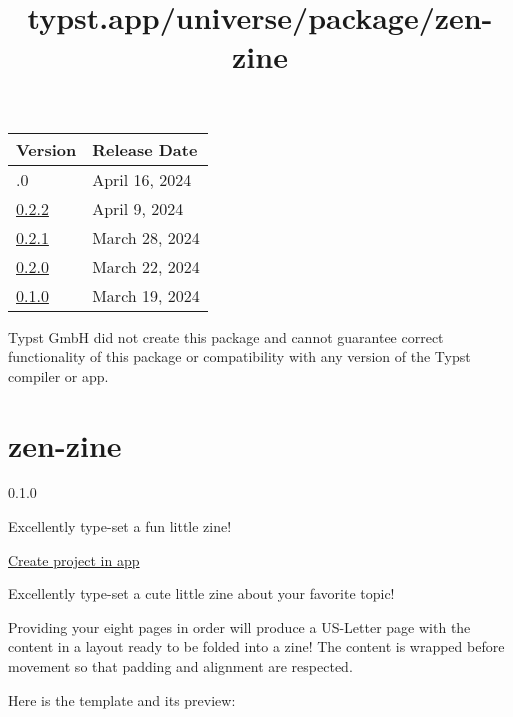 \begin{longtable}[]{@{}ll@{}}
\toprule\noalign{}
Version & Release Date \\
\midrule\noalign{}
\endhead
\bottomrule\noalign{}
\endlastfoot
0.3.0 & April 16, 2024 \\
\href{https://typst.app/universe/package/suiji/0.2.2/}{0.2.2} & April 9,
2024 \\
\href{https://typst.app/universe/package/suiji/0.2.1/}{0.2.1} & March
28, 2024 \\
\href{https://typst.app/universe/package/suiji/0.2.0/}{0.2.0} & March
22, 2024 \\
\href{https://typst.app/universe/package/suiji/0.1.0/}{0.1.0} & March
19, 2024 \\
\end{longtable}

Typst GmbH did not create this package and cannot guarantee correct
functionality of this package or compatibility with any version of the
Typst compiler or app.


\title{typst.app/universe/package/zen-zine}

\label{banner}
\label{template-thumbnail}

\section{zen-zine}\label{zen-zine}

{ 0.1.0 }

Excellently type-set a fun little zine!

\href{/app?template=zen-zine&version=0.1.0}{Create project in app}

\label{readme}
Excellently type-set a cute little zine about your favorite topic!

Providing your eight pages in order will produce a US-Letter page with
the content in a layout ready to be folded into a zine! The content is
wrapped before movement so that padding and alignment are respected.

Here is the template and its preview:

